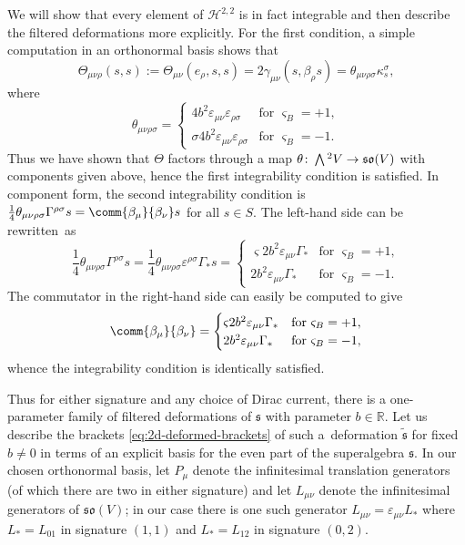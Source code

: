 \documentclass[pdftex]{sigma}
\numberwithin{equation}{section}
\newcommand{\fs}{\mathfrak{s}}
\newcommand{\fso}{\mathfrak{so}}
\newcommand{\RR}{\mathbb{R}}
\newcommand{\cH}{\mathcal{H}}
\newcommand{\fstilde}{\widetilde{\fs}}
\newcommand{\Wedge}{\mathchoice{{\textstyle\bigwedge}}{\bigwedge}{\bigwedge}{\bigwedge}}	%
\newcommand{\1}{\mathbbm{1}}
\begin{document}
We will show that every element of $\cH^{2,2}$ is in fact integrable and then describe the filtered deformations more explicitly. For the first condition, a simple computation in an orthonormal basis shows that
\[
	\Theta_{\mu\nu\rho}(s,s)
	:= \Theta_{\mu\nu}(e_\rho,s,s)
	= 2\gamma_{\mu\nu}(s,\beta_\rho s)
	= \theta_{\mu\nu\rho\sigma}\kappa_s^\sigma,
\]
where
\[
	\theta_{\mu\nu\rho\sigma} =
		\begin{cases}
			4b^2\varepsilon_{\mu\nu}\varepsilon_{\rho\sigma}
				& \text{for } \varsigma_B = +1,	\\
			\sigma 4b^2\varepsilon_{\mu\nu}\varepsilon_{\rho\sigma}
				& \text{for } \varsigma_B = -1.
		\end{cases}
\]
Thus we have shown that $\Theta$ factors through a map $\theta\colon\Wedge^2 V\to \fso(V)$ with components given above, hence the first integrability condition is satisfied. In component form, the second integrability condition is
$\frac{1}{4}\theta_{\mu\nu\rho\sigma}\Gamma^{\rho\sigma}s = \comm{\beta_\mu}{\beta_\nu}s
$
for all $s\in S$. The left-hand side can be rewritten~as
\[
	\frac{1}{4}\theta_{\mu\nu\rho\sigma}\Gamma^{\rho\sigma}s
		= \frac{1}{4}\theta_{\mu\nu\rho\sigma}\varepsilon^{\rho\sigma}\Gamma_*s
		= 	\begin{cases}
				\varsigma 2b^2\varepsilon_{\mu\nu}\Gamma_*
					& \text{for } \varsigma_B = +1,	\\
				2b^2\varepsilon_{\mu\nu}\Gamma_*
					& \text{for } \varsigma_B = -1.
			\end{cases}
\]
The commutator in the right-hand side can easily be computed to give
\[
	\comm{\beta_\mu}{\beta_\nu} =
		\begin{cases}
			\varsigma 2b^2\varepsilon_{\mu\nu}\Gamma_*
				& \text{for } \varsigma_B = +1,	\\
			2b^2\varepsilon_{\mu\nu}\Gamma_*
				& \text{for } \varsigma_B = -1,
		\end{cases}
\]
whence the integrability condition is identically satisfied.

Thus for either signature and any choice of Dirac current, there is a one-parameter family of filtered deformations of $\fs$ with parameter $b\in\RR$. Let us describe the brackets \eqref{eq:2d-deformed-brackets} of such a~deformation $\fstilde$ for fixed $b\neq 0$ in terms of an explicit basis for the even part of the superalgebra $\fs$. In our chosen orthonormal basis, let $P_\mu$ denote the infinitesimal translation generators (of which there are two in either signature) and let $L_{\mu\nu}$ denote the infinitesimal generators of $\fso(V)$; in our case there is one such generator $L_{\mu\nu}=\varepsilon_{\mu\nu} L_*$ where $L_* = L_{01}$ in signature $(1,1)$ and $L_*=L_{12}$ in signature $(0,2)$.
\end{document}
